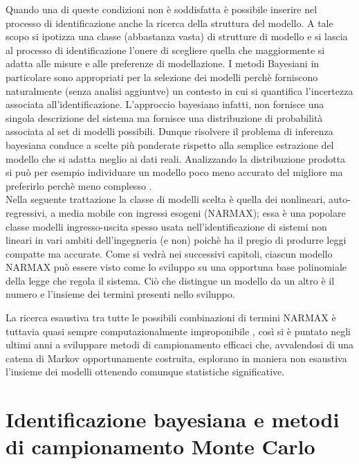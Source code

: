 \documentclass[10pt,a4paper,oneside,openany,noindent]{report}
\begin{document}
Quando una di queste condizioni non è soddisfatta è possibile inserire nel processo di identificazione anche la ricerca della struttura del modello.
A tale scopo si ipotizza una classe (abbastanza vasta) di strutture di modello
e si lascia al processo di identificazione l’onere di scegliere quella che maggiormente si adatta
alle misure e alle preferenze di modellazione. I metodi Bayesiani in particolare sono appropriati per la selezione dei
modelli perchè forniscono naturalmente (senza analisi aggiuntve) un contesto in cui
si quantifica l’incertezza associata all’identificazione. L’approccio bayesiano infatti, non fornisce una singola descrizione del sistema ma fornisce una distribuzione di
probabilità associata al set di modelli possibili. Dunque risolvere il problema di
inferenza bayesiana conduce a scelte più  ponderate rispetto alla semplice estrazione
del modello che si adatta meglio ai dati reali. Analizzando la distribuzione prodotta
si può per esempio individuare un modello poco meno accurato del migliore ma
preferirlo perchè meno complesso .\\
Nella seguente trattazione la classe di modelli scelta è quella dei nonlineari, auto-regressivi, a media mobile
con ingressi esogeni (NARMAX); essa è una popolare classe modelli ingresso-uscita
spesso usata nell’identificazione di sistemi non lineari in vari ambiti dell’ingegneria
(e non) poichè ha il pregio di produrre leggi compatte ma accurate.
Come si vedrà nei successivi capitoli, ciascun modello NARMAX può essere visto
come lo sviluppo su una opportuna base polinomiale della legge che
regola il sistema. Ciò che distingue un modello da un altro è il numero e l’insieme
dei termini presenti nello sviluppo.

La ricerca esaustiva tra tutte le possibili combinazioni di termini NARMAX è tuttavia quasi sempre computazionalmente improponibile , così si è puntato negli ultimi
anni a sviluppare metodi di campionamento efficaci che, avvalendosi di una catena
di Markov opportunamente costruita, esplorano in maniera non esaustiva l’insieme
dei modelli ottenendo comunque statistiche significative.
\chapter{Identificazione bayesiana e metodi
di campionamento Monte Carlo}
\end{document}
